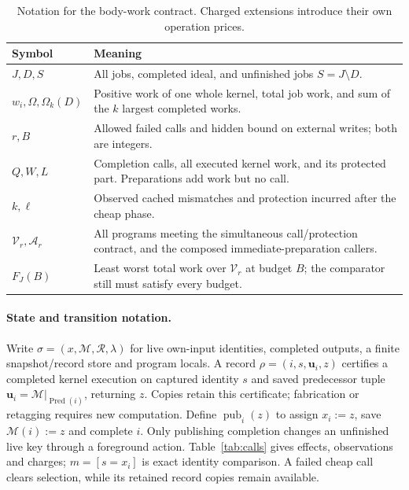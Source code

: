 \documentclass[acmsmall,screen,review,anonymous]{acmart}
\begin{document}
\begin{table}[t]
\caption{Notation for the body-work contract. Charged extensions introduce their own operation prices.}
\label{tab:notation}\centering\small
\begin{tabularx}{\linewidth}{@{}lX@{}}
\toprule
Symbol & Meaning\\
\midrule
$J,D,S$ & All jobs, completed ideal, and unfinished jobs $S=J\setminus D$.\\
$w_i,\Omega,\Omega_k(D)$ & Positive work of one whole kernel, total job work, and sum of the $k$ largest completed works.\\
$r,B$ & Allowed failed calls and hidden bound on external writes; both are integers.\\
$Q,W,L$ & Completion calls, all executed kernel work, and its protected part. Preparations add work but no call.\\
$k,\ell$ & Observed cached mismatches and protection incurred after the cheap phase.\\
$\mathcal V_r,\mathcal A_r$ & All programs meeting the simultaneous call/protection contract, and the composed immediate-preparation callers.\\
$F_J(B)$ & Least worst total work over $\mathcal V_r$ at budget $B$; the comparator still must satisfy every budget.\\
\bottomrule
\end{tabularx}
\end{table}

\paragraph{State and transition notation.}
Write $\sigma=(x,\mathcal M,\mathcal R,\lambda)$ for live own-input identities, completed outputs, a finite snapshot/record store and program locals. A record $\rho=(i,s,\mathbf u_i,z)$ certifies a completed kernel execution on captured identity $s$ and saved predecessor tuple $\mathbf u_i=\mathcal M|_{\operatorname{Pred}(i)}$, returning $z$. Copies retain this certificate; fabrication or retagging requires new computation. Define $\operatorname{pub}_i(z)$ to assign $x_i:=z$, save $\mathcal M(i):=z$ and complete $i$. Only publishing completion changes an unfinished live key through a foreground action. Table~\ref{tab:calls} gives effects, observations and charges; $m=[s=x_i]$ is exact identity comparison. A failed cheap call clears selection, while its retained record copies remain available.
\end{document}
